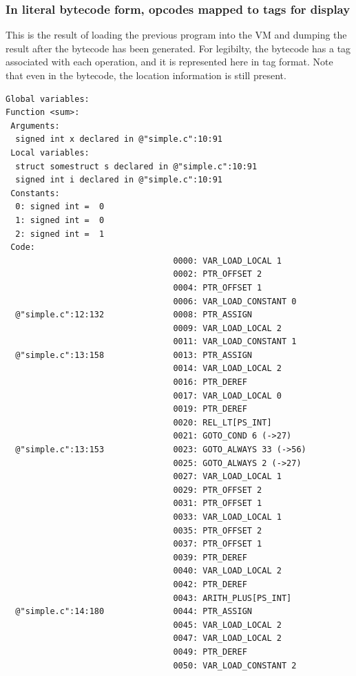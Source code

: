 \documentclass[10pt,a4paper]{report}
\begin{document}
\subsubsection{In literal bytecode form, opcodes mapped to tags for display}
This is the result of loading the previous program into the VM and dumping the result after the bytecode has been generated. For legibilty, the bytecode has a tag associated with each operation, and it is represented here in tag format. Note that even in the bytecode, the location information is still present.

\begin{verbatim}
Global variables:
Function <sum>:
 Arguments:
  signed int x declared in @"simple.c":10:91
 Local variables:
  struct somestruct s declared in @"simple.c":10:91
  signed int i declared in @"simple.c":10:91
 Constants:
  0: signed int =  0
  1: signed int =  0
  2: signed int =  1
 Code:
                                  0000: VAR_LOAD_LOCAL 1
                                  0002: PTR_OFFSET 2
                                  0004: PTR_OFFSET 1
                                  0006: VAR_LOAD_CONSTANT 0
  @"simple.c":12:132              0008: PTR_ASSIGN
                                  0009: VAR_LOAD_LOCAL 2
                                  0011: VAR_LOAD_CONSTANT 1
  @"simple.c":13:158              0013: PTR_ASSIGN
                                  0014: VAR_LOAD_LOCAL 2
                                  0016: PTR_DEREF
                                  0017: VAR_LOAD_LOCAL 0
                                  0019: PTR_DEREF
                                  0020: REL_LT[PS_INT]
                                  0021: GOTO_COND 6 (->27)
  @"simple.c":13:153              0023: GOTO_ALWAYS 33 (->56)
                                  0025: GOTO_ALWAYS 2 (->27)
                                  0027: VAR_LOAD_LOCAL 1
                                  0029: PTR_OFFSET 2
                                  0031: PTR_OFFSET 1
                                  0033: VAR_LOAD_LOCAL 1
                                  0035: PTR_OFFSET 2
                                  0037: PTR_OFFSET 1
                                  0039: PTR_DEREF
                                  0040: VAR_LOAD_LOCAL 2
                                  0042: PTR_DEREF
                                  0043: ARITH_PLUS[PS_INT]
  @"simple.c":14:180              0044: PTR_ASSIGN
                                  0045: VAR_LOAD_LOCAL 2
                                  0047: VAR_LOAD_LOCAL 2
                                  0049: PTR_DEREF
                                  0050: VAR_LOAD_CONSTANT 2

\end{verbatim}
\end{document}
